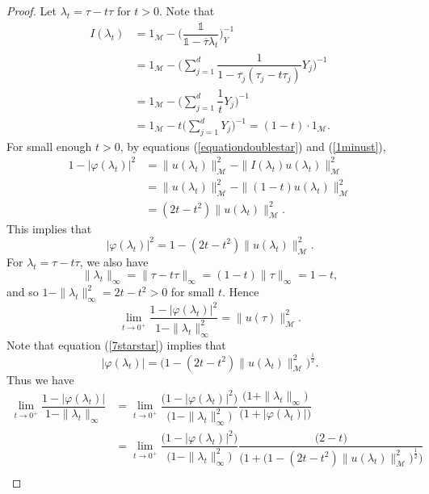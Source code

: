\documentclass[11pt, reqno]{amsart}
\newcommand\1{\boldsymbol {1}}
\numberwithin{equation}{section}
\begin{document}
\begin{proof}
Let $\lambda_{t}=\tau-t\tau$ for $t>0$. Note that
\begin{align}
    I(\lambda_{t}) &= 1_{\mathcal{M}}-\bigg(\dfrac{\mathds{1}}{\mathds{1}-\overline{\tau}\lambda_{t}}\bigg)_{Y}^{-1} \nonumber\\
    &= 1_{\mathcal{M}}-\bigg( \sum_{j=1}^{d} \dfrac{1}{1-\overline{\tau_{j}}(\tau_{j}-t\tau_{j})}Y_{j}\bigg)^{-1}\nonumber\\
    &= 1_{\mathcal{M}}-\bigg( \sum_{j=1}^{d} \dfrac{1}{t}Y_{j}\bigg)^{-1}\nonumber\\
    &= 1_{\mathcal{M}}-t\bigg( \sum_{j=1}^{d} Y_{j}\bigg)^{-1}
    = (1-t)\cdot1_{\mathcal{M}}.\label{1minust}
\end{align}
For small enough $t>0$, by equations (\ref{equationdoublestar}) and (\ref{1minust}),
\begin{align*}
    1-\lvert \varphi(\lambda_{t}) \rvert^{2} &= \|u(\lambda_{t})\|_{\mathcal{M}}^{2} - \|I(\lambda_{t})u(\lambda_{t})\|_{\mathcal{M}}^{2} \\
    &= \|u(\lambda_{t})\|_{\mathcal{M}}^{2}-\|(1-t)u(\lambda_{t})\|^{2}_{\mathcal{M}}\\
    &= (2t-t^{2})\|u(\lambda_{t})\|^{2}_{\mathcal{M}}.
\end{align*}
This implies that
\begin{equation}\label{7starstar}
    \lvert \varphi(\lambda_{t})\rvert^{2}=1-(2t-t^{2})\|u(\lambda_{t})\|^{2}_{\mathcal{M}}.
\end{equation}
For $\lambda_{t}=\tau-t\tau$, we also have
$$\|\lambda_{t}\|_{\infty} = \|\tau-t\tau\|_{\infty} = (1-t)\|\tau\|_{\infty} = 1-t,$$
and so $1-\|\lambda_{t}\|^{2}_{\infty} = 2t-t^{2}>0$ for small $t$. Hence 
$$\lim_{t\rightarrow 0^{+}}\dfrac{1-\lvert \varphi(\lambda_{t})\rvert^{2}}{1-\|\lambda_{t}\|^{2}_{\infty}} = \|u(\tau)\|^{2}_{\mathcal{M}}.$$
Note that equation (\ref{7starstar}) implies that
$$\lvert \varphi(\lambda_{t})\rvert = \big(1-(2t-t^{2})\|u(\lambda_{t})\|^{2}_{\mathcal{M}}\big)^{\frac{1}{2}}.$$
Thus we have
\begin{align*}
    \lim_{t\rightarrow 0^{+}}\dfrac{1-\lvert \varphi(\lambda_{t}) \rvert}{1-\|\lambda_{t}\|_{\infty}}&=\lim_{t\rightarrow 0^{+}}\dfrac{\big(1-\lvert \varphi(\lambda_{t})\rvert^{2}\big)}{\big(1-\|\lambda_{t}\|^{2}_{\infty}\big)} \dfrac{\big(1+\|\lambda_{t}\|_{\infty}\big)}{\big(1+\lvert \varphi(\lambda_{t})\rvert\big)}\\
    &=\lim_{t\rightarrow 0^{+}}\dfrac{\big(1-\lvert \varphi(\lambda_{t})\rvert^{2}\big)}{\big(1-\|\lambda_{t}\|^{2}_{\infty}\big)}\dfrac{\big(2-t\big)}{\big(1+\big(1-(2t-t^{2})\|u(\lambda_{t})\|^{2}_{\mathcal{M}}\big)^{\frac{1}{2}}\big)}\\

\end{align*}
\end{proof}
\end{document}
